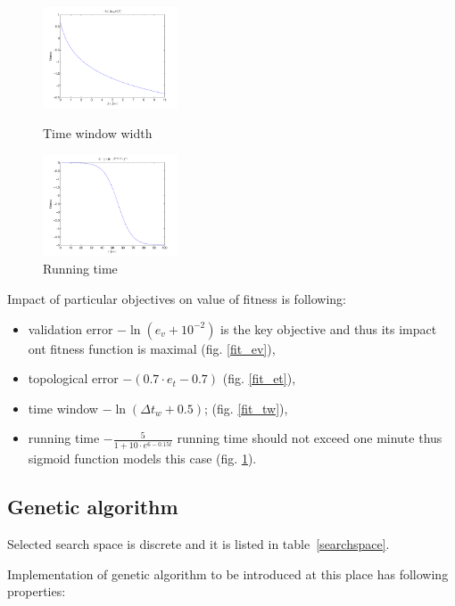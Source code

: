 \documentclass[a4paper,jurnal]{IEEEtran}
\begin{document}
\begin{figure}[h] %
	\parbox{40mm}{
		\includegraphics[width=40mm]{fit_tw}
		\caption{Time window width}
		\label{fit_tw}
	}
	\qquad
	\parbox{40mm}{
		\includegraphics[width=40mm]{fit_tr}
		\caption{Running time}
		\label{fit_tr}
	}
\end{figure}
Impact of particular objectives on value of fitness is following:
\begin{itemize}
	\item validation error $ -\ln(e_v+10^{-2 }) $ is the key objective and thus its impact
	ont fitness function is maximal (fig. \ref{fit_ev}),
	\item topological error $ -(0.7\cdot e_t-0.7) $ (fig. \ref{fit_et}),
	\item time window $ -\ln(\Delta t_w+0.5) $; (fig. \ref{fit_tw}),
	\item running time $ -\frac{5}{1+10\cdot e^{6-0.15t}} $ running
	time should not exceed one minute thus sigmoid function models this case (fig.
	 \ref{fit_tr}).
\end{itemize}


\subsection{Genetic algorithm}
Selected search space is discrete and it is listed  in table~\ref{searchspace}.%

Implementation of genetic algorithm to be introduced at this place
has following properties:
\end{document}
